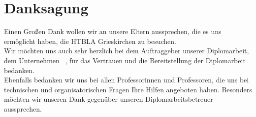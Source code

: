 \chapter{Danksagung}
Einen Großen Dank wollen wir an unsere Eltern aussprechen, die es uns ermöglicht haben, die HTBLA Grieskirchen zu besuchen.\\
Wir möchten uns auch sehr herzlich bei dem Auftraggeber unserer Diplomarbeit, dem Unternehmen \ThPartnerName \, , für das Vertrauen und die Bereitstellung der Diplomarbeit bedanken.\\
Ebenfalls bedanken wir uns bei allen Professorinnen und Professoren, die uns bei technischen und organisatorischen Fragen Ihre Hilfen angeboten haben. Besonders möchten wir unseren Dank gegenüber unseren Diplomarbeitsbetreuer \ThSupervisorName \, aussprechen.
